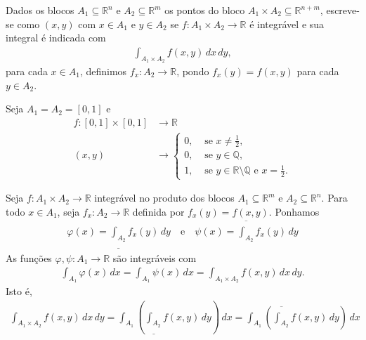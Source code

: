 Dados os blocos $A_1\subseteq\mathbb{R}^{n}$ e $A_2\subseteq\mathbb{R}^{m}$ os pontos do bloco $A_1\times A_2\subseteq \mathbb{R}^{n+m}$, escreve-se como $(x,y)$ com $x\in A_1$ e $y\in A_2$ se $f:A_1\times A_2\to\mathbb{R}$ é integrável e sua integral é indicada com
\begin{align*}
  \int_{A_1\times A_2}f(x,y)\,dx\,dy,
\end{align*}
para cada $x\in A_1$, definimos $f_x:A_2\to\mathbb{R}$, pondo $f_x(y)=f(x,y)$ para cada $y\in A_2$.
\begin{example}
  Seja $A_1=A_2=[0,1]$ e  
  \begin{align*}
    f:[0,1]\times[0,1]&\to\mathbb{R}\\
                 (x,y)&\to\begin{cases}
                  0, &\text{ se } x\neq\frac{1}{2} \text{,} \\
                  0, &\text{ se } y\in\mathbb{Q},\\
                  1, &\text{ se } y\in\mathbb{R}\setminus\mathbb{Q}\text{ e } x=\frac{1}{2}.
                \end{cases}
  \end{align*}
\end{example}
\begin{theorem}
  Seja $f:A_1\times A_2\to\mathbb{R}$ integrável no produto dos blocos $A_1\subseteq\mathbb{R}^{m}$ e $A_2\subseteq\mathbb{R}^{n}$. Para todo $x\in A_1$, seja $f_x:A_2\to\mathbb{R}$ definida por $f_x(y)=f(x,y)$. Ponhamos
  \begin{align*}
    \varphi(x)=\underline{\int_{A_2}}f_x(y)\,dy\quad\text{e}\quad\psi(x)=\overline{\int_{A_2}}f_x(y)\,dy
  \end{align*}
  As funções $\varphi,\psi:A_1\to\mathbb{R}$ são integráveis com
  \begin{align*}
    \int_{A_1}\varphi(x)\,dx=\int_{A_1}\psi(x)\,dx=\int_{A_1\times A_2}f(x,y)\,dx\,dy.
  \end{align*}
  Isto é,
  \begin{align*}
    \int_{A_1\times A_2}f(x,y)\,dx\,dy=\int_{A_1}\left( \underline{\int_{A_2}}f(x,y)\,dy \right)\,dx=\int_{A_1}\left( \overline{\int_{A_2}}f(x,y)\,dy \right)\,dx
  \end{align*}
\end{theorem}
